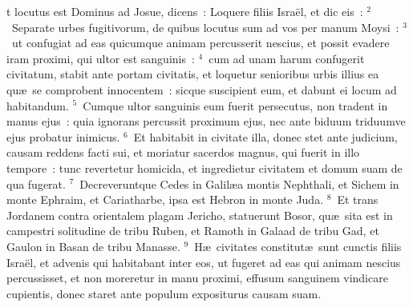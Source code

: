 \bchapter
{}t locutus est Dominus ad Josue, dicens~: Loquere filiis Isra\"el, et dic eis~:
${}^{2}$~Separate urbes fugitivorum, de quibus locutus sum ad vos per manum Moysi~:
${}^{3}$~ut confugiat ad eas quicumque animam percusserit nescius, et possit evadere iram proximi, qui ultor est sanguinis~:
${}^{4}$~cum ad unam harum confugerit civitatum, stabit ante portam civitatis, et loquetur senioribus urbis illius ea qu\ae\ se comprobent innocentem~: sicque suscipient eum, et dabunt ei locum ad habitandum.
${}^{5}$~Cumque ultor sanguinis eum fuerit persecutus, non tradent in manus ejus~: quia ignorans percussit proximum ejus, nec ante biduum triduumve ejus probatur inimicus.
${}^{6}$~Et habitabit in civitate illa, donec stet ante judicium, causam reddens facti sui, et moriatur sacerdos magnus, qui fuerit in illo tempore~: tunc revertetur homicida, et ingredietur civitatem et domum suam de qua fugerat.
${}^{7}$~Decreveruntque Cedes in Galil\ae a montis Nephthali, et Sichem in monte Ephraim, et Cariatharbe, ipsa est Hebron in monte Juda.
${}^{8}$~Et trans Jordanem contra orientalem plagam Jericho, statuerunt Bosor, qu\ae\ sita est in campestri solitudine de tribu Ruben, et Ramoth in Galaad de tribu Gad, et Gaulon in Basan de tribu Manasse.
${}^{9}$~H\ae\ civitates constitut\ae\ sunt cunctis filiis Isra\"el, et advenis qui habitabant inter eos, ut fugeret ad eas qui animam nescius percussisset, et non moreretur in manu proximi, effusum sanguinem vindicare cupientis, donec staret ante populum expositurus causam suam.

